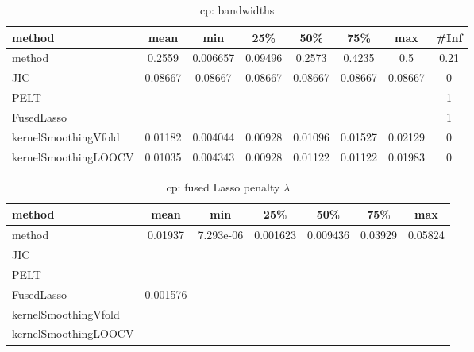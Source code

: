 \begin{table}[ht]
\centering
\begin{tabular}{l|c|ccccc|c}
  \hline
method & mean & min & 25\% & 50\% & 75\% & max & \#Inf \\ 
  \hline
method & 0.2559 & 0.006657 & 0.09496 & 0.2573 & 0.4235 &   0.5 & 0.21 \\ 
  JIC & 0.08667 & 0.08667 & 0.08667 & 0.08667 & 0.08667 & 0.08667 &   0 \\ 
  PELT &  &  &  &  &  &  &   1 \\ 
  FusedLasso &  &  &  &  &  &  &   1 \\ 
  kernelSmoothingVfold & 0.01182 & 0.004044 & 0.00928 & 0.01096 & 0.01527 & 0.02129 &   0 \\ 
  kernelSmoothingLOOCV & 0.01035 & 0.004343 & 0.00928 & 0.01122 & 0.01122 & 0.01983 &   0 \\ 
   \hline
\end{tabular}
\caption{cp: bandwidths} 
\label{tab:cpBandwidths}
\end{table}
\begin{table}[ht]
\centering
\begin{tabular}{l|c|ccccc}
  \hline
method & mean & min & 25\% & 50\% & 75\% & max \\ 
  \hline
method & 0.01937 & 7.293e-06 & 0.001623 & 0.009436 & 0.03929 & 0.05824 \\ 
  JIC &  &  &  &  &  &  \\ 
  PELT &  &  &  &  &  &  \\ 
  FusedLasso & 0.001576 &  &  &  &  &  \\ 
  kernelSmoothingVfold &  &  &  &  &  &  \\ 
  kernelSmoothingLOOCV &  &  &  &  &  &  \\ 
   \hline
\end{tabular}
\caption{cp: fused Lasso penalty $\lambda$} 
\label{tab:cpLambdas}
\end{table}
